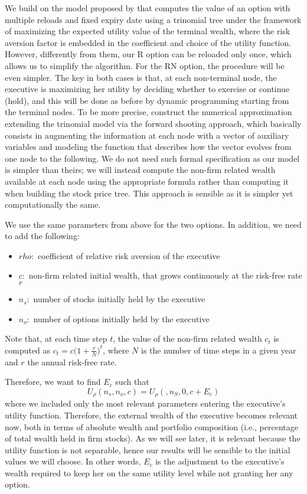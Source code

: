 We build on the model proposed by \cite{lau2005valuation} that computes the value of an option with multiple reloads and fixed expiry date using a trinomial tree under the framework of maximizing the expected utility value of the terminal wealth, where the risk aversion factor is embedded in the coefficient and choice of the utility function. However, differently from them, our R option can be reloaded only once, which allows us to simplify the algorithm. For the RN option, the procedure will be even simpler. The key in both cases is that, at each non-terminal node, the executive is maximizing her utility by deciding whether to exercise or continue (hold), and this will be done as before by dynamic programming starting from the terminal nodes.
To be more precise, \cite{lau2005valuation} construct the numerical approximation extending the trinomial model via the forward shooting approach, which basically consists in augmenting the information at each node with a vector of auxiliary variables and modeling the function that describes how the vector evolves from one node to the following. We do not need such formal specification as our model is simpler than theirs; we will instead compute the non-firm related wealth available at each node using the appropriate formula rather than computing it when building the stock price tree. This approach is sensible as it is simpler yet computationally the same.

We use the same parameters from above for the two options. In addition, we need to add the following: 
\begin{itemize}
    \item $rho: $ coefficient of relative risk aversion of the executive
    \item $c: $ non-firm related initial wealth, that grows continuously at the risk-free rate $r$
    \item $n_s: $ number of stocks initially held by the executive
    \item $n_o: $ number of options initially held by the executive
\end{itemize}
Note that, at each time step $t$, the value of the non-firm related wealth $c_t$ is computed as $c_t = c \bigl(1+\frac{r}{N}\bigr)^{t}$, where $N$ is the number of time steps in a given year and $r$ the annual risk-free rate. 


Therefore, we want to find $E_c$ such that 
$$U_\rho(n_s, n_o, c) = U_\rho(, n_S, 0, c + E_c) $$ %
where we included only the most relevant parameters entering the executive's utility function. Therefore, the external wealth of the executive becomes relevant now, both in terms of absolute wealth and portfolio composition (i.e., percentage of total wealth held in firm stocks). As we will see later, it is relevant because the utility function is not separable, hence our results will be sensible to the initial values we will choose. In other words, $E_c$ is the adjustment to the executive's wealth required to keep her on the same utility level while not granting her any option.

